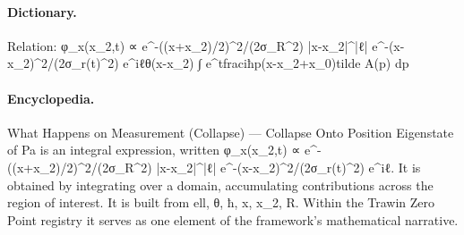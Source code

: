 \paragraph{Dictionary.}
Relation: φ\_x(x\_2,t) ∝ e\textasciicircum{}-((x+x\_2)/2)\textasciicircum{}2/(2σ\_R\textasciicircum{}2) |x-x\_2|\textasciicircum{}|ℓ| e\textasciicircum{}-(x-x\_2)\textasciicircum{}2/(2σ\_r(t)\textasciicircum{}2) e\textasciicircum{}iℓθ(x-x\_2) ∫ e\textasciicircum{}tfraciħp(x-x\_2+x\_0)tilde A(p) dp

\paragraph{Encyclopedia.}
What Happens on Measurement (Collapse) — Collapse Onto Position Eigenstate of Pa is an integral expression, written φ\_x(x\_2,t) ∝ e\textasciicircum{}-((x+x\_2)/2)\textasciicircum{}2/(2σ\_R\textasciicircum{}2) |x-x\_2|\textasciicircum{}|ℓ| e\textasciicircum{}-(x-x\_2)\textasciicircum{}2/(2σ\_r(t)\textasciicircum{}2) e\textasciicircum{}iℓ. It is obtained by integrating over a domain, accumulating contributions across the region of interest. It is built from ell, θ, ħ, x, x\_2, R. Within the Trawin Zero Point registry it serves as one element of the framework's mathematical narrative.
